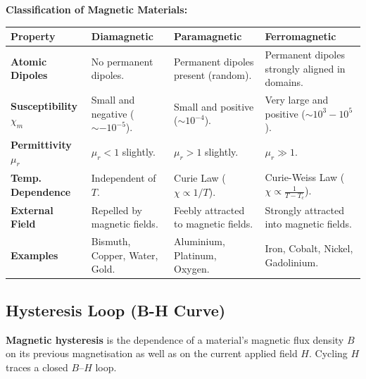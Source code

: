 \documentclass[12pt,a4paper]{article}
\begin{document}
\textbf{Classification of Magnetic Materials:}\par\vspace{6pt}\noindent
\begin{tabularx}{\linewidth}{|B{3.0cm}|Y|Y|Y|}
\hline
\textbf{Property} & \textbf{Diamagnetic} & \textbf{Paramagnetic} & \textbf{Ferromagnetic} \\
\hline
\textbf{Atomic Dipoles} & No permanent dipoles. & Permanent dipoles present (random). & Permanent dipoles strongly aligned in domains. \\
\hline
\textbf{Susceptibility $\chi_m$} & Small and negative ($\sim -10^{-5}$). & Small and positive ($\sim 10^{-4}$). & Very large and positive ($\sim 10^3 - 10^5$). \\
\hline
\textbf{Permittivity $\mu_r$} & $\mu_r < 1$ slightly. & $\mu_r > 1$ slightly. & $\mu_r \gg 1$. \\
\hline
\textbf{Temp. Dependence} & Independent of $T$. & Curie Law ($\chi \propto 1/T$). & Curie-Weiss Law ($\chi \propto \frac{1}{T - T_c}$). \\
\hline
\textbf{External Field} & Repelled by magnetic fields. & Feebly attracted to magnetic fields. & Strongly attracted into magnetic fields. \\
\hline
\textbf{Examples} & Bismuth, Copper, Water, Gold. & Aluminium, Platinum, Oxygen. & Iron, Cobalt, Nickel, Gadolinium. \\
\hline
\end{tabularx}

\subsection{Hysteresis Loop (B-H Curve)}

\begin{tcolorbox}[defbox, title={Magnetic Hysteresis}]
\textbf{Magnetic hysteresis} is the dependence of a material's magnetic flux density $B$ on its previous magnetisation as well as on the current applied field $H$. Cycling $H$ traces a closed $B$--$H$ loop.
\end{tcolorbox}
\end{document}
